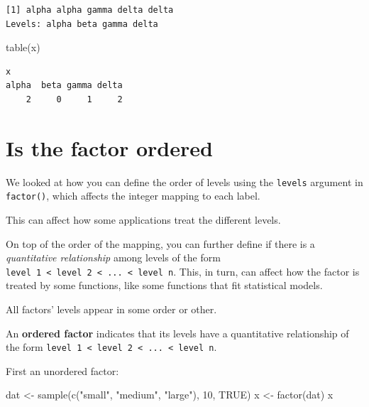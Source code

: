 \documentclass[
]{book}
\makeatletter
\newenvironment{Shaded}{\begin{snugshade}}{\end{snugshade}}
\newcommand{\ConstantTok}[1]{\textcolor[rgb]{0.00,0.00,0.00}{#1}}
\newcommand{\DecValTok}[1]{\textcolor[rgb]{0.00,0.00,0.81}{#1}}
\newcommand{\FunctionTok}[1]{\textcolor[rgb]{0.00,0.00,0.00}{#1}}
\newcommand{\NormalTok}[1]{#1}
\newcommand{\OtherTok}[1]{\textcolor[rgb]{0.56,0.35,0.01}{#1}}
\newcommand{\StringTok}[1]{\textcolor[rgb]{0.31,0.60,0.02}{#1}}
\newenvironment{kframe}{%
\medskip{}
\setlength{\fboxsep}{.8em}
 \def\at@end@of@kframe{}%
 \ifinner\ifhmode%
  \def\at@end@of@kframe{\end{minipage}}%
  \begin{minipage}{\columnwidth}%
 \fi\fi%
 \def\FrameCommand##1{\hskip\@totalleftmargin \hskip-\fboxsep
 \colorbox{shadecolor}{##1}\hskip-\fboxsep
     \hskip-\linewidth \hskip-\@totalleftmargin \hskip\columnwidth}%
 \MakeFramed {\advance\hsize-\width
   \@totalleftmargin\z@ \linewidth\hsize
   \@setminipage}}%
 {\par\unskip\endMakeFramed%
 \at@end@of@kframe}
\newenvironment{rmdblock}[1]
  {
  \begin{itemize}
  \renewcommand{\labelitemi}{
    \raisebox{-.7\height}[0pt][0pt]{
      {\setkeys{Gin}{width=3em,keepaspectratio}\texttt{[image: images/\#1]}}
    }
  }
  \setlength{\fboxsep}{1em}
  \begin{kframe}
  \item
  }
  {
  \end{kframe}
  \end{itemize}
  }
\newenvironment{note}
  {\begin{rmdblock}{note}}
  {\end{rmdblock}}
\makeatother
\begin{document}
\begin{verbatim}
[1] alpha alpha gamma delta delta
Levels: alpha beta gamma delta
\end{verbatim}

\begin{Shaded}
\begin{Highlighting}[]
\FunctionTok{table}\NormalTok{(x)}
\end{Highlighting}
\end{Shaded}

\begin{verbatim}
x
alpha  beta gamma delta 
    2     0     1     2 
\end{verbatim}

\hypertarget{is-the-factor-ordered}{%
\section{\texorpdfstring{Is the factor \textbf{ordered}}{Is the factor ordered}}\label{is-the-factor-ordered}}

We looked at how you can define the order of levels using the \texttt{levels} argument in \texttt{factor()}, which affects the integer mapping to each label.

This can affect how some applications treat the different levels.

On top of the order of the mapping, you can further define if there is a \emph{quantitative relationship} among levels of the form \texttt{level\ 1\ \textless{}\ level\ 2\ \textless{}\ ...\ \textless{}\ level\ n}. This, in turn, can affect how the factor is treated by some functions, like some functions that fit statistical models.

\begin{note}
All factors' levels appear in some order or other.

An \textbf{ordered factor} indicates that its levels have a quantitative
relationship of the form
\texttt{level\ 1\ \textless{}\ level\ 2\ \textless{}\ ...\ \textless{}\ level\ n}.
\end{note}

First an unordered factor:

\begin{Shaded}
\begin{Highlighting}[]
\NormalTok{dat }\OtherTok{\textless{}{-}} \FunctionTok{sample}\NormalTok{(}\FunctionTok{c}\NormalTok{(}\StringTok{"small"}\NormalTok{, }\StringTok{"medium"}\NormalTok{, }\StringTok{"large"}\NormalTok{), }\DecValTok{10}\NormalTok{, }\ConstantTok{TRUE}\NormalTok{)}
\NormalTok{x }\OtherTok{\textless{}{-}} \FunctionTok{factor}\NormalTok{(dat)}
\NormalTok{x}
\end{Highlighting}
\end{Shaded}
\end{document}
